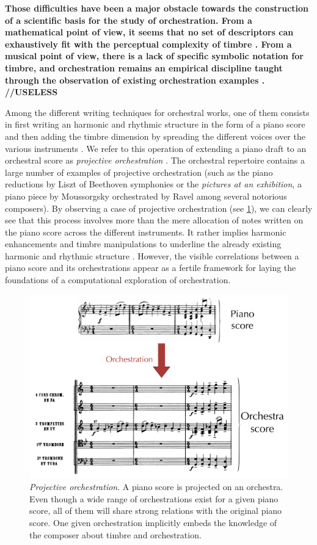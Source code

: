 \documentclass{article}
\begin{document}
\textbf{Those difficulties have been a major obstacle towards the construction of a scientific basis for the study of orchestration. From a mathematical point of view, it seems that no set of descriptors can exhaustively fit with the perceptual complexity of timbre \cite{peeters2011timbre}. From a musical point of view, there is a lack of specific symbolic notation for timbre, and orchestration remains an empirical discipline taught through the observation of existing orchestration examples \cite{piston-orch}. //USELESS}

Among the different writing techniques for orchestral works, one of them consists in first writing an harmonic and rhythmic structure in the form of a piano score and then adding the timbre dimension by spreading the different voices over the various instruments \cite{piston-orch}. We refer to this operation of extending a piano draft to an orchestral score as \textit{projective orchestration} \cite{eslingthesis}.
The orchestral repertoire contains a large number of examples of projective orchestration (such as the piano reductions by Liszt of Beethoven symphonies or the \textit{pictures at an exhibition}, a piano piece by Moussorgsky orchestrated by Ravel among several notorious composers). By observing a case of projective orchestration (see \ref{fig:orch}), we can clearly see that this process involves more than the mere allocation of notes written on the piano score across the different instruments. It rather implies harmonic enhancements and timbre manipulations to underline the already existing harmonic and rhythmic structure \cite{mcadams2013timbre}. However, the visible correlations between a piano score and its orchestrations appear as a fertile framework for laying the foundations of a computational exploration of orchestration.

\begin{figure}
\centering
\includegraphics[scale=0.15]{orch}
\caption{\textit{Projective orchestration}. A piano score is projected on an orchestra. Even though a wide range of orchestrations exist for a given piano score, all of them will share strong relations with the original piano score. One given orchestration implicitly embeds the knowledge of the composer about timbre and orchestration.}
\label{fig:orch}
\end{figure}
\end{document}
